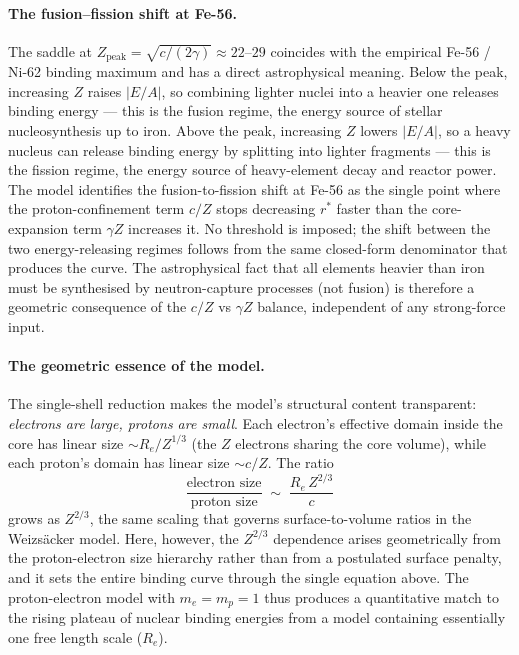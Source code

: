 \documentclass[11pt]{article}
\begin{document}
\paragraph{The fusion--fission shift at Fe-56.}
The saddle at $Z_\text{peak} = \sqrt{c/(2\gamma)} \approx 22$--$29$ coincides with the empirical Fe-56 / Ni-62 binding maximum and has a direct astrophysical meaning. Below the peak, increasing $Z$ raises $|E/A|$, so combining lighter nuclei into a heavier one releases binding energy --- this is the fusion regime, the energy source of stellar nucleosynthesis up to iron. Above the peak, increasing $Z$ lowers $|E/A|$, so a heavy nucleus can release binding energy by splitting into lighter fragments --- this is the fission regime, the energy source of heavy-element decay and reactor power. The model identifies the fusion-to-fission shift at Fe-56 as the single point where the proton-confinement term $c/Z$ stops decreasing $r^*$ faster than the core-expansion term $\gamma Z$ increases it. No threshold is imposed; the shift between the two energy-releasing regimes follows from the same closed-form denominator that produces the curve. The astrophysical fact that all elements heavier than iron must be synthesised by neutron-capture processes (not fusion) is therefore a geometric consequence of the $c/Z$ vs $\gamma Z$ balance, independent of any strong-force input.

\paragraph{The geometric essence of the model.}
The single-shell reduction makes the model's structural content transparent: \emph{electrons are large, protons are small}. Each electron's effective domain inside the core has linear size $\sim R_e/Z^{1/3}$ (the $Z$ electrons sharing the core volume), while each proton's domain has linear size $\sim c/Z$. The ratio
\begin{equation}
\frac{\text{electron size}}{\text{proton size}} \;\sim\; \frac{R_e \, Z^{2/3}}{c}
\end{equation}
grows as $Z^{2/3}$, the same scaling that governs surface-to-volume ratios in the Weizsäcker model. Here, however, the $Z^{2/3}$ dependence arises geometrically from the proton-electron size hierarchy rather than from a postulated surface penalty, and it sets the entire binding curve through the single equation above. The proton-electron model with $m_e = m_p = 1$ thus produces a quantitative match to the rising plateau of nuclear binding energies from a model containing essentially one free length scale ($R_e$).
\end{document}

